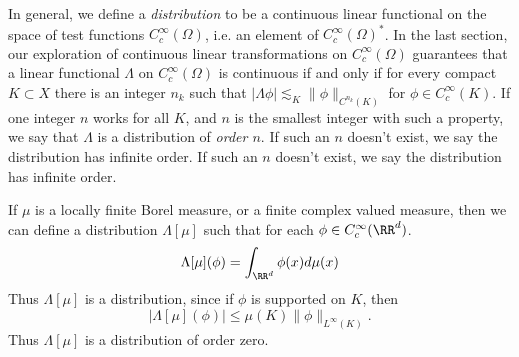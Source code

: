 In general, we define a \emph{distribution} to be a continuous linear functional on the space of test functions $C_c^\infty(\Omega)$, i.e. an element of $C_c^\infty(\Omega)^*$. In the last section, our exploration of continuous linear transformations on $C_c^\infty(\Omega)$ guarantees that a linear functional $\Lambda$ on $C_c^\infty(\Omega)$ is continuous if and only if for every compact $K \subset X$ there is an integer $n_k$ such that $|\Lambda \phi| \lesssim_K \| \phi \|_{C^{n_k}(K)}$ for $\phi \in C_c^\infty(K)$. If one integer $n$ works for all $K$, and $n$ is the smallest integer with such a property, we say that $\Lambda$ is a distribution of \emph{order $n$}. If such an $n$ doesn't exist, we say the distribution has infinite order. If such an $n$ doesn't exist, we say the distribution has infinite order.

\begin{example}
    If $\mu$ is a locally finite Borel measure, or a finite complex valued measure, then we can define a distribution $\Lambda[\mu]$ such that for each $\phi \in C_c^\infty(\RR^d)$.
    \[ \Lambda[\mu](\phi) = \int_{\RR^d} \phi(x) d\mu(x) \]
    Thus $\Lambda[\mu]$ is a distribution, since if $\phi$ is supported on $K$, then
    \[ |\Lambda[\mu](\phi)| \leq \mu(K) \| \phi \|_{L^\infty(K)}. \]
    Thus $\Lambda[\mu]$ is a distribution of order zero.
\end{example}

